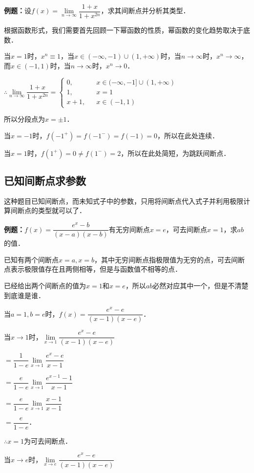 \textbf{例题：}设$f(x)=\lim\limits_{n\to\infty}\dfrac{1+x}{1+x^{2n}}$，求其间断点并分析其类型．

根据函数形式，我们需要首先回顾一下幂函数的性质，幂函数的变化趋势取决于底数．

当$x=1$时，$x^n\equiv 1$，当$x\in(-\infty,-1)\cup(1,+\infty)$时，当$n\to\infty$时，$x^n\to\infty$，而$x\in(-1,1)$时，当$n\to\infty$时，$x^n\to 0$．

$\therefore\lim\limits_{n\to\infty}\dfrac{1+x}{1+x^{2n}}=\left\{\begin{array}{lcl}
        0,   &  & x\in(-\infty,-1]\cup(1,+\infty) \\
        1,   &  & x=1                                        \\
        x+1, &  & x\in(-1,1)
    \end{array}
    \right.$

所以分段点为$x=\pm 1$．

当$x=-1$时，$f(-1^+)=f(-1^-)=f(-1)=0$，所以在此处连续．

当$x=1$时，$f(1^+)=0\neq f(1^-)=2$，所以在此处简短，为跳跃间断点．

\subsection{已知间断点求参数}

这种题目已知间断点，而未知式子中的参数，只用将间断点代入式子并利用极限计算间断点的类型就可以了．

\textbf{例题：}$f(x)=\dfrac{e^x-b}{(x-a)(x-b)}$有无穷间断点$x=e$，可去间断点$x=1$，求$ab$的值．

已知有两个间断点$x=a,x=b$，其中无穷间断点指极限值为无穷的点，可去间断点表示极限值存在且两侧相等，但是与函数值不相等的点．

已经给出两个间断点的值为$x=1$和$x=e$，所以$ab$必然对应其中一个，但是不清楚到底谁是谁．

当$a=1,b=e$时，$f(x)=\dfrac{e^x-e}{(x-1)(x-e)}$．

当$x\to 1$时，$\lim\limits_{x\to 1}\dfrac{e^x-e}{(x-1)(x-e)}$

$=\dfrac{1}{1-e}\lim\limits_{x\to 1}\dfrac{e^x-e}{x-1}$

$=\dfrac{e}{1-e}\lim\limits_{x\to 1}\dfrac{e^{x-1}-1}{x-1}$

$=\dfrac{e}{1-e}\lim\limits_{x\to 1}\dfrac{x-1}{x-1}$

$=\dfrac{e}{1-e}$．

$\therefore x=1$为可去间断点．

    当$x\to e$时，$\lim\limits_{x\to e}\dfrac{e^x-e}{(x-1)(x-e)}$
    
